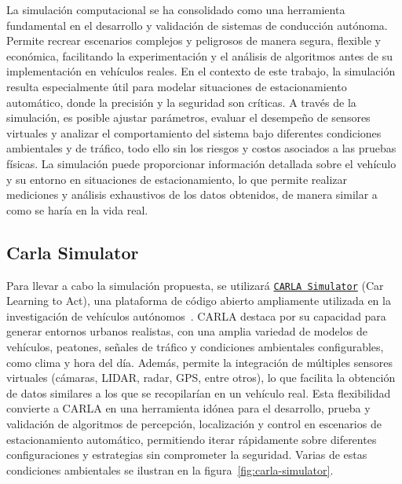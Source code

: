 
\noindent
La simulación computacional se ha consolidado como una herramienta fundamental en el desarrollo y validación de sistemas de conducción autónoma.
Permite recrear escenarios complejos y peligrosos de manera segura, flexible y económica, facilitando la experimentación 
y el análisis de algoritmos antes de su implementación en vehículos reales. 
En el contexto de este trabajo, la simulación resulta especialmente útil para modelar situaciones de estacionamiento automático,
donde la precisión y la seguridad son críticas. 
A través de la simulación, es posible ajustar parámetros, evaluar el desempeño de sensores virtuales 
y analizar el comportamiento del sistema bajo diferentes condiciones ambientales y de tráfico, 
todo ello sin los riesgos y costos asociados a las pruebas físicas.
La simulación puede proporcionar información detallada sobre el vehículo y su entorno en situaciones de estacionamiento,
lo que permite realizar mediciones y análisis exhaustivos de los datos obtenidos, de manera similar a como se haría en la vida real.

\subsection{Carla Simulator}\label{subsec:carla-simulator}
\noindent
Para llevar a cabo la simulación propuesta, se utilizará \texttt{\href{https://github.com/carla-simulator/carla}{CARLA Simulator}} (Car Learning to Act), una plataforma de código abierto ampliamente utilizada en la investigación de vehículos autónomos~\cite{dosovitskiy2017carla}.
CARLA destaca por su capacidad para generar entornos urbanos realistas, con una amplia variedad de modelos de vehículos, peatones, señales de tráfico y condiciones ambientales configurables, como clima y hora del día. 
Además, permite la integración de múltiples sensores virtuales (cámaras, LIDAR, radar, GPS, entre otros), lo que facilita la obtención de datos similares a los que se recopilarían en un vehículo real. 
Esta flexibilidad convierte a CARLA en una herramienta idónea para el desarrollo, prueba y validación de algoritmos de percepción, localización y control en escenarios de estacionamiento automático, permitiendo iterar rápidamente sobre diferentes configuraciones y estrategias sin comprometer la seguridad.
\noindent
Varias de estas condiciones ambientales se ilustran en la figura~\ref{fig:carla-simulator}.


